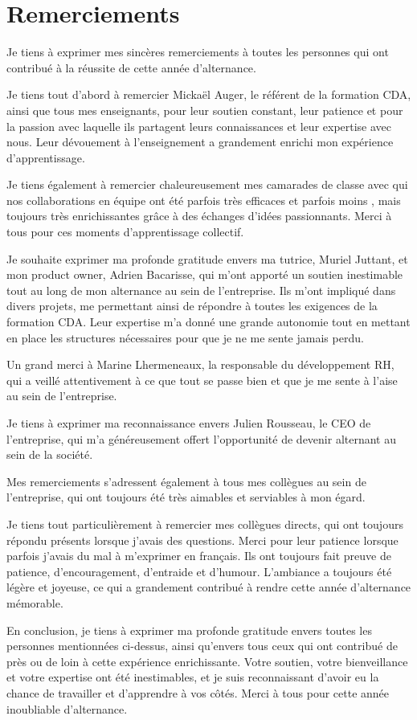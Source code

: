 \chapter{Remerciements}\label{ch:remerciements}

Je tiens à exprimer mes sincères remerciements à toutes les personnes qui ont contribué à la réussite de cette année d'alternance.

Je tiens tout d'abord à remercier Mickaël Auger, le référent de la formation CDA, ainsi que tous mes enseignants, pour leur soutien constant, leur patience et pour la passion avec laquelle ils partagent leurs connaissances et leur expertise avec nous. Leur dévouement à l'enseignement a grandement enrichi mon expérience d'apprentissage.

Je tiens également à remercier chaleureusement mes camarades de classe avec qui nos collaborations en équipe ont été parfois très efficaces et parfois moins \Laughey[1.2], mais toujours très enrichissantes grâce à des échanges d'idées passionnants. Merci à tous pour ces moments d'apprentissage collectif.

Je souhaite exprimer ma profonde gratitude envers ma tutrice, Muriel Juttant, et mon product owner, Adrien Bacarisse, qui m'ont apporté un soutien inestimable tout au long de mon alternance au sein de l'entreprise. Ils m'ont impliqué dans divers projets, me permettant ainsi de répondre à toutes les exigences de la formation CDA. Leur expertise m'a donné une grande autonomie tout en mettant en place les structures nécessaires pour que je ne me sente jamais perdu.

Un grand merci à Marine Lhermeneaux, la responsable du développement RH, qui a veillé attentivement à ce que tout se passe bien et que je me sente à l'aise au sein de l'entreprise.

Je tiens à exprimer ma reconnaissance envers Julien Rousseau, le CEO de l'entreprise, qui m'a généreusement offert l'opportunité de devenir alternant au sein de la société.

Mes remerciements s'adressent également à tous mes collègues au sein de l'entreprise, qui ont toujours été très aimables et serviables à mon égard.

Je tiens tout particulièrement à remercier mes collègues directs, qui ont toujours répondu présents lorsque j'avais des questions. Merci pour leur patience lorsque parfois j'avais du mal à m'exprimer en français. Ils ont toujours fait preuve de patience, d'encouragement, d'entraide et d'humour. L'ambiance a toujours été légère et joyeuse, ce qui a grandement contribué à rendre cette année d'alternance mémorable.

En conclusion, je tiens à exprimer ma profonde gratitude envers toutes les personnes mentionnées ci-dessus, ainsi qu'envers tous ceux qui ont contribué de près ou de loin à cette expérience enrichissante. Votre soutien, votre bienveillance et votre expertise ont été inestimables, et je suis reconnaissant d'avoir eu la chance de travailler et d'apprendre à vos côtés. Merci à tous pour cette année inoubliable d'alternance.